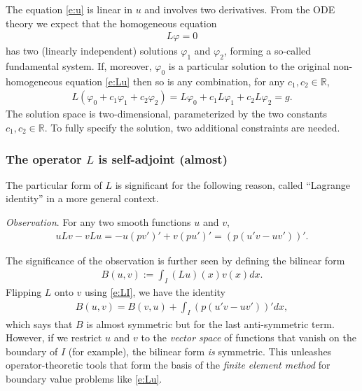 \documentclass[12pt,a4paper]{article}
\newcommand{\IR}{\mathbb{R}}
\begin{document}
    The equation \eqref{e:u} is linear in $u$ and involves two derivatives.
    From the ODE theory we expect that
    the homogeneous equation
    \begin{align}
        \label{e:L0}
        L \varphi = 0
    \end{align}
    has two (linearly independent) solutions
    $\varphi_1$ and $\varphi_2$,
    forming a so-called fundamental system.
    If, moreover, $\varphi_0$ is a particular solution
    to the original non-homogeneous equation \eqref{e:Lu}
    then so is any combination,
    for any $c_1, c_2 \in \IR$,
    \begin{align}
        L(\varphi_0 + c_1 \varphi_1 + c_2 \varphi_2)
        =
        L \varphi_0
        +
        c_1 L \varphi_1
        +
        c_2 L \varphi_2
        = 
        g
        .
    \end{align}
    The solution space is two-dimensional,
    parameterized by the two constants $c_1, c_2 \in \IR$.
    To fully specify the solution,
    two additional constraints are needed.
    
    
    
    \subsubsection*{The operator $L$ is self-adjoint (almost)}
    
    The particular form of $L$ is significant 
    for the following reason,
    called ``Lagrange identity'' in a more general context.
    
    \emph{Observation}.
    For any two smooth functions $u$ and $v$,
    \begin{align}
        \label{e:LI}
        u L v - v L u
        =
        - u (p v')'
        + v (p u')'
        =
        (p (u' v - u v'))'
        .
    \end{align}

    
    The significance of the observation 
    is further seen by defining
    the bilinear form
    \begin{align}
        B(u, v) 
        :=
        \int_I (L u)(x) v(x) dx
        .
    \end{align}
    Flipping $L$ onto $v$ using \eqref{e:LI}, 
    we have the identity
    \begin{align}
        B(u, v)
        =
        B(v, u)
        +
        \int_I (p (u' v - u v'))' dx
        ,
    \end{align}
    which says that $B$ is almost symmetric
    but for the last anti-symmetric term.
    However,
    if we restrict $u$ and $v$ 
    to the \emph{vector space} of functions
    that vanish on the boundary of $I$
    (for example),
    the bilinear form \emph{is} symmetric.
    This unleashes operator-theoretic tools
    that form the basis of 
    the \emph{finite element method}
    for boundary value problems like \eqref{e:Lu}.
    
\end{document}

